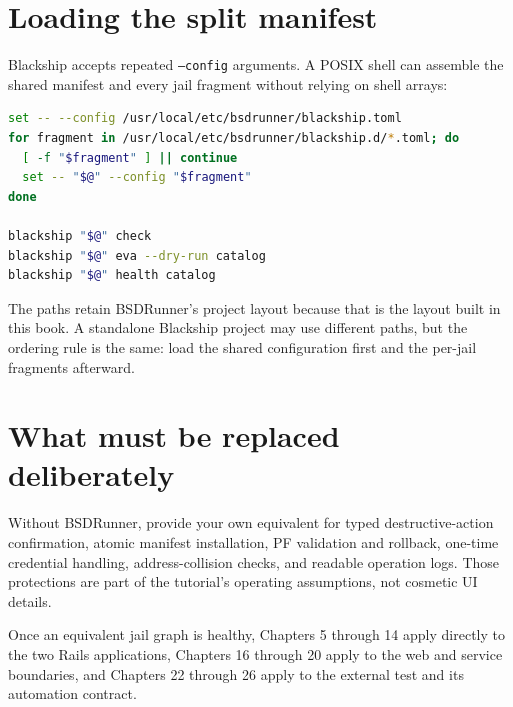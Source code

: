 \section{Loading the split manifest}

Blackship accepts repeated \texttt{--config} arguments. A POSIX shell can
assemble the shared manifest and every jail fragment without relying on shell
arrays:

\begin{lstlisting}[language=sh]
set -- --config /usr/local/etc/bsdrunner/blackship.toml
for fragment in /usr/local/etc/bsdrunner/blackship.d/*.toml; do
  [ -f "$fragment" ] || continue
  set -- "$@" --config "$fragment"
done

blackship "$@" check
blackship "$@" eva --dry-run catalog
blackship "$@" health catalog
\end{lstlisting}

The paths retain BSDRunner's project layout because that is the layout built
in this book. A standalone Blackship project may use different paths, but the
ordering rule is the same: load the shared configuration first and the
per-jail fragments afterward.

\section{What must be replaced deliberately}

Without BSDRunner, provide your own equivalent for typed destructive-action
confirmation, atomic manifest installation, PF validation and rollback,
one-time credential handling, address-collision checks, and readable operation
logs. Those protections are part of the tutorial's operating assumptions, not
cosmetic UI details.

Once an equivalent jail graph is healthy, Chapters 5 through 14 apply directly
to the two Rails applications, Chapters 16 through 20 apply to the web and
service boundaries, and Chapters 22 through 26 apply to the external test and
its automation contract.
